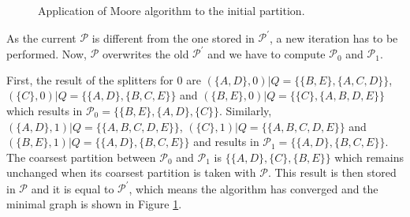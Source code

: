 {%

\begin{figure}
\centering
{}
\caption{Application of Moore algorithm to the initial partition.\label{fig:moore_fin}}
\end{figure}

As the current $\mathcal{P}$ is different from the one stored in $\mathcal{P}^{\prime}$, a new iteration has to be performed. Now, $\mathcal{P}$ overwrites the old $\mathcal{P}^{\prime}$ and we have to compute $\mathcal{P}_0$ and $\mathcal{P}_1$.

First, the result of the splitters for 0 are $(\{A,D\},0)|Q = \{\{B,E\},\{A,C,D\}\}$, $(\{C\},0)|Q = \{\{A,D\},\{B,C,E\}\}$ and $(\{B,E\},0)|Q = \{\{C\},\{A,B,D,E\}\}$ which results in \linebreak $\mathcal{P}_0 = \{\{B,E\}, \{A,D\}, \{C\}\}$. Similarly, $(\{A,D\},1)|Q = \{\{A,B,C,D,E\}\}$, $(\{C\},1)|Q = \{\{A,B,C,D,E\}\}$ and $(\{B,E\},1)|Q = \{\{A,D\},\{B,C,E\}\}$ and results in \linebreak $\mathcal{P}_1 = \{\{A,D\},\{B,C,E\}\}$. The coarsest partition between $\mathcal{P}_0$ and $\mathcal{P}_1$ is $\{\{A,D\},\{C\},\{B,E\}\}$ which remains unchanged when its coarsest partition is taken with $\mathcal{P}$. This result is then stored in $\mathcal{P}$ and it is equal to $\mathcal{P}^{\prime}$, which means the algorithm has converged and the minimal graph is shown in Figure \ref{fig:moore_fin}.


}
